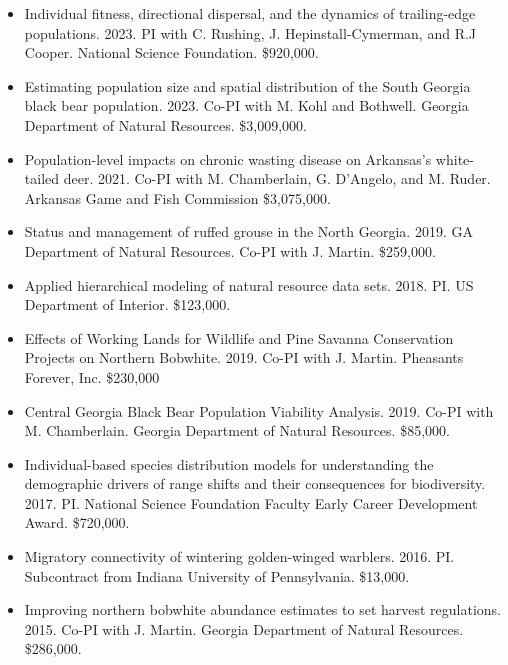 \documentclass[12pt]{article}
\begin{document}
\begin{itemize}

\item Individual fitness, directional dispersal, and the dynamics of
  trailing-edge populations. 2023. PI with C. Rushing, J.
  Hepinstall-Cymerman, and R.J Cooper. National Science Foundation. 
  \$920,000.

\item Estimating population size and spatial distribution of the South
  Georgia black bear population. 2023. Co-PI with M. Kohl and
  Bothwell. Georgia Department of Natural Resources. \$3,009,000. 

  
\item Population-level impacts on chronic wasting disease on
  Arkansas's white-tailed deer. 2021. Co-PI with M. Chamberlain,
  G. D'Angelo, and M. Ruder. Arkansas Game and Fish Commission
  \$3,075,000. 

\item Status and management of ruffed grouse in the North
  Georgia. 2019. GA Department of Natural Resources. Co-PI with
  J. Martin. \$259,000.

\item Applied hierarchical modeling of natural resource data
  sets. 2018. PI. US Department of Interior. \$123,000.

\item Effects of Working Lands for Wildlife and Pine Savanna
  Conservation Projects on Northern Bobwhite. 2019. Co-PI with
  J. Martin. Pheasants Forever, Inc. \$230,000

\item Central Georgia Black Bear Population Viability
  Analysis. 2019. Co-PI with M. Chamberlain. Georgia Department of
  Natural Resources. \$85,000.
  
\item Individual-based species distribution models for
  understanding the demographic drivers of range shifts and their
  consequences for biodiversity. 2017. PI. National Science
  Foundation Faculty Early Career Development Award. \$720,000. 

\item Migratory connectivity of wintering golden-winged
  warblers. 2016. PI. Subcontract from Indiana University of
  Pennsylvania. \$13,000. 

\item Improving northern bobwhite abundance estimates to set harvest
  regulations. 2015. Co-PI with J. Martin. Georgia Department of
  Natural Resources. \$286,000.


\end{itemize}
\end{document}
